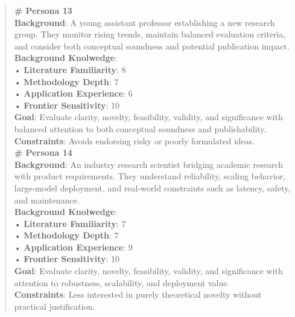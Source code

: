 \begin{quote}
\begin{tcolorbox}[breakable,colback=persona!20!white, colframe=persona!60!black, title=\textbf{Personas}]
        \textbf{\# Persona 13}\\
        \textbf{Background}: A young assistant professor establishing a new research group. They monitor rising trends, maintain balanced evaluation criteria, and consider both conceptual soundness and potential publication impact.\\
        \textbf{Background Knolwedge}:\\
        • \textbf{Literature Familiarity}: 8\\
        • \textbf{Methodology Depth}: 7\\
        • \textbf{Application Experience}: 6\\
        • \textbf{Frontier Sensitivity}: 10\\
        \textbf{Goal}: Evaluate clarity, novelty, feasibility, validity, and significance with balanced attention to both conceptual soundness and publishability.\\
        \textbf{Constraints}: Avoids endorsing risky or poorly formulated ideas.\\

        \textbf{\# Persona 14}\\
        \textbf{Background}: An industry research scientist bridging academic research with product requirements. They understand reliability, scaling behavior, large-model deployment, and real-world constraints such as latency, safety, and maintenance.\\
        \textbf{Background Knolwedge}:\\
        • \textbf{Literature Familiarity}: 7\\
        • \textbf{Methodology Depth}: 7\\
        • \textbf{Application Experience}: 9\\
        • \textbf{Frontier Sensitivity}: 10\\
        \textbf{Goal}: Evaluate clarity, novelty, feasibility, validity, and significance with attention to robustness, scalability, and deployment value.\\
        \textbf{Constraints}: Less interested in purely theoretical novelty without practical justification.\\


\end{tcolorbox}
\end{quote}
